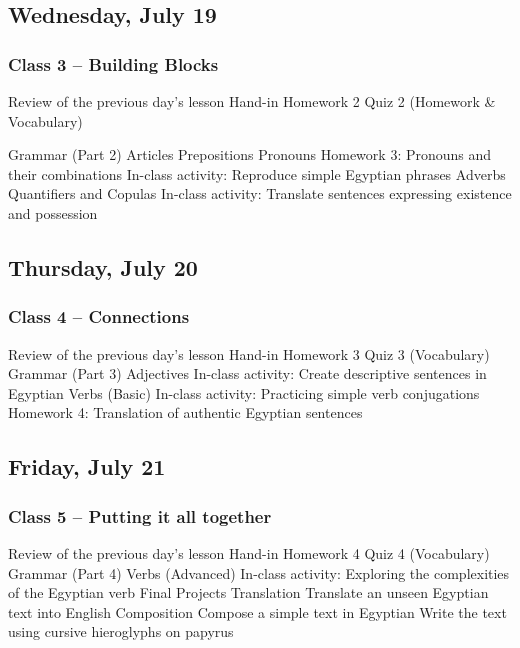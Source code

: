 \documentclass[11pt]{article}
\begin{document}
	\subsection*{Wednesday, July 19}
		\subsubsection*{Class 3 -- Building Blocks}
			\begin{outline}[itemize]
				\1 Review of the previous day's lesson
					\2 Hand-in Homework 2
					\2 Quiz 2 (Homework \& Vocabulary)
				
				\1 Grammar (Part 2)
					\2 Articles
					\2 Prepositions
					\2 Pronouns 
						\3 Homework 3: Pronouns and their combinations
						\3 In-class activity: Reproduce simple Egyptian phrases
					\2 Adverbs
					\2 Quantifiers and Copulas
						\3 In-class activity: Translate sentences expressing existence and possession
			\end{outline}
			
	\subsection*{Thursday, July 20}
		\subsubsection*{Class 4 -- Connections}
			\begin{outline}[itemize]
				\1 Review of the previous day's lesson
					\2 Hand-in Homework 3
					\2 Quiz 3 (Vocabulary)
				\1 Grammar (Part 3)
					\2 Adjectives
						\3 In-class activity: Create descriptive sentences in Egyptian
					\2 Verbs (Basic)
						\3 In-class activity: Practicing simple verb conjugations
						\3 Homework 4: Translation of authentic Egyptian sentences
			\end{outline}
			
	\subsection*{Friday, July 21}
		\subsubsection*{Class 5 -- Putting it all together}
			\begin{outline}[itemize]
				\1 Review of the previous day's lesson
					\2 Hand-in Homework 4
					\2 Quiz 4 (Vocabulary)
				\1 Grammar (Part 4)
					\2 Verbs (Advanced)
						\3 In-class activity: Exploring the complexities of the Egyptian verb
				\1 Final Projects
					\2 Translation 
						\3 Translate an unseen Egyptian text into English
					\2 Composition
						\3 Compose a simple text in Egyptian
						\3 Write the text using cursive hieroglyphs on papyrus
					
			\end{outline}
	
%	
\end{document}

